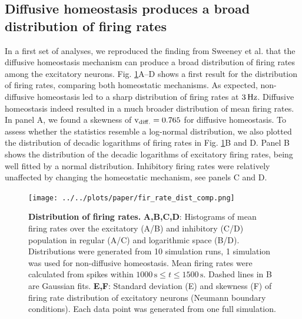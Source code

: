 \documentclass[10pt,letterpaper]{article}
\begin{document}
\subsection*{Diffusive homeostasis produces a broad distribution of firing rates}\label{Fir_Dist_Section}
In a first set of analyses, we reproduced the finding from Sweeney et al. \cite{Sweeney_Paper} that the diffusive homeostasis mechanism can produce a broad distribution of firing rates among the excitatory neurons. Fig. \ref{Fir_Rate_Dist_Comp}A--D shows a first result for the distribution of firing rates, comparing both homeostatic mechanisms. As expected, non-diffusive homeostasis led to a sharp distribution of firing rates at $\rm 3\, Hz$. Diffusive homeostasis indeed resulted in a much broader distribution of mean firing rates. In panel A, we found a skewness of $\mathrm{v_{\rm diff.} = 0.765}$ for diffusive homeostasis. To assess whether the statistics resemble a log-normal distribution, we also plotted the distribution of decadic logarithms of firing rates in Fig. \ref{Fir_Rate_Dist_Comp}B and D. Panel B shows the distribution of the decadic logarithms of excitatory firing rates, being well fitted by a normal distribution. Inhibitory firing rates were relatively unaffected by changing the homeostatic mechanism, see panels C and D.  

\begin{figure}
\begin{center}
\texttt{[image: ../../plots/paper/fir\_rate\_dist\_comp.png]}
\end{center}
\caption{{\bf Distribution of firing rates.} \textbf{A,B,C,D}: Histograms of mean firing rates over the excitatory (A/B) and inhibitory (C/D) population in regular (A/C) and logarithmic space (B/D). Distributions were generated from 10 simulation runs, 1 simulation was used for non-diffusive homeostasis. Mean firing rates were calculated from spikes within $\mathrm{1000\,s} \leq t  \mathrm{\leq 1500\,s}$. Dashed lines in B are Gaussian fits. \textbf{E,F}: Standard deviation (E) and skewness (F) of firing rate distribution of excitatory neurons (Neumann boundary conditions). Each data point was generated from one full simulation.}
\label{Fir_Rate_Dist_Comp}
\end{figure}
\end{document}
